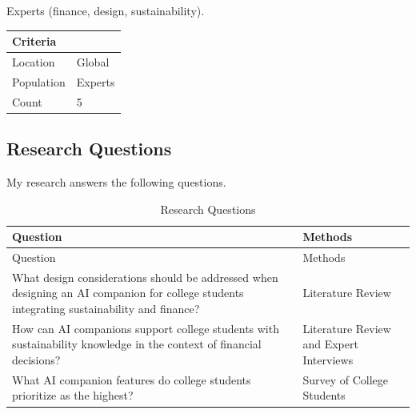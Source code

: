 \documentclass[
  12pt,
  letterpaper,
  DIV=11,
  numbers=noendperiod]{scrartcl}
\begin{document}
Experts (finance, design, sustainability).

\begin{longtable}[]{@{}ll@{}}
\toprule\noalign{}
Criteria & \\
\midrule\noalign{}
\endhead
\bottomrule\noalign{}
\endlastfoot
Location & Global \\
Population & Experts \\
Count & 5 \\
\end{longtable}

\subsection{Research Questions}\label{research-questions}

My research answers the following questions.

\begin{longtable}[]{@{}
  >{\raggedright\arraybackslash}p{}
  >{\raggedright\arraybackslash}p{}@{}}
\caption{Research Questions}\tabularnewline
\toprule\noalign{}
\begin{minipage}[b]{\linewidth}\raggedright
Question
\end{minipage} & \begin{minipage}[b]{\linewidth}\raggedright
Methods
\end{minipage} \\
\midrule\noalign{}
\endfirsthead
\toprule\noalign{}
\begin{minipage}[b]{\linewidth}\raggedright
Question
\end{minipage} & \begin{minipage}[b]{\linewidth}\raggedright
Methods
\end{minipage} \\
\midrule\noalign{}
\endhead
\bottomrule\noalign{}
\endlastfoot
What design considerations should be addressed when designing an AI
companion for college students integrating sustainability and finance? &
Literature Review \\
How can AI companions support college students with sustainability
knowledge in the context of financial decisions? & Literature Review and
Expert Interviews \\
What AI companion features do college students prioritize as the
highest? & Survey of College Students \\
\end{longtable}
\end{document}
